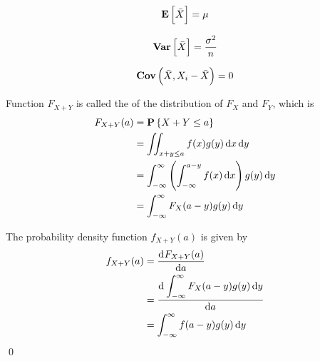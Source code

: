 \begin{theorem}
\begin{equation}
    \mathop{\bf E\/} \left[ \bar{X} \right] = \mu
\end{equation}    
\end{theorem}

\begin{theorem}
\begin{equation}
    \mathop{\bf Var\/}\left[ \bar{X} \right] = \frac{\sigma^2}{n}
\end{equation}    
\end{theorem}
\begin{theorem}
\begin{equation}
    \mathop{\bf Cov\/}\left(\bar{X},X_i - \bar{X} \right) = 0
\end{equation}    
\end{theorem}

\begin{definition}
    Function $F_{X+Y}$ is called the  of the distribution of $F_X$ and $F_Y$, which is
    \begin{equation}
        \begin{aligned}
            F_{X+Y}(a) &= \probability{X + Y \leq a} \\
            &= \iint_{x+y \leq a} f(x) g(y) \dif{x} \dif{y} \\
            &= \int_{-\infty}^\infty \left( \int_{-\infty}^{a - y} f(x) \dif{x} \right) g(y) \dif{y} \\
            &= \int_{-\infty}^\infty F_X (a-y)g(y) \dif{y}
        \end{aligned}
    \end{equation}
    
    The probability density function $f_{X+Y}(a)$ is given by 
    \begin{equation}
        \begin{aligned}
            f_{X+Y}(a) &= \dod{F_{X+Y}(a)}{a} \\
            &= \dod{\displaystyle \int_{-\infty}^\infty F_X (a-y)g(y) \dif{y}}{a} \\
            &= \int_{-\infty}^{\infty} f(a-y) g(y) \dif{y}
        \end{aligned}
    \end{equation} \qed
\end{definition}




